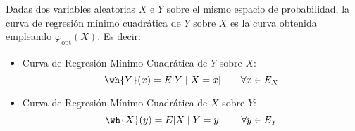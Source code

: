 \begin{definicion}
    Dadas dos variables aleatorias $X$ e $Y$ sobre el mismo espacio de probabilidad, la curva de regresión mínimo cuadrática de $Y$ sobre $X$ es la curva obtenida empleando $\varphi_{\text{opt}}(X)$. Es decir:
    \begin{itemize}
        \item Curva de Regresión Mínimo Cuadrática de $Y$ sobre $X$:
        \begin{equation*}
            \wh{Y}(x)=E[Y\mid X=x]\qquad \forall x\in E_X
        \end{equation*}

        \item Curva de Regresión Mínimo Cuadrática de $X$ sobre $Y$:
        \begin{equation*}
            \wh{X}(y)=E[X\mid Y=y] \qquad \forall y\in E_Y
        \end{equation*}
    \end{itemize}
\end{definicion}

